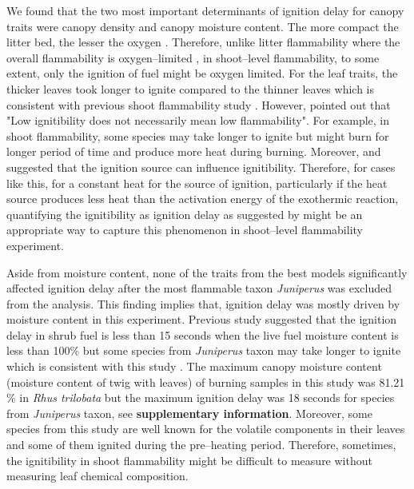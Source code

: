 \documentclass{bmcart}
\begin{document}
We found that the two most important determinants of ignition delay for canopy traits were canopy density and canopy moisture content. The more compact the litter bed, the lesser the oxygen  \citep{scarff2006leaf, van2012species, engber2012patterns, de2012leaf, cornwell2015flammability}.  
Therefore, unlike litter flammability where the overall flammability is oxygen--limited \citep{schwilk2015dimensions}, in shoot--level flammability, to some extent, only the ignition of fuel might be oxygen limited. For the leaf traits, the thicker leaves took longer to ignite compared to the thinner leaves which is consistent with previous shoot flammability study \citep{alam2020shoot}.  However, \citet{montgomery1971effect} pointed out that "Low ignitibility does not necessarily mean low flammability".  For example, in shoot flammability, some species may take longer to ignite but might burn for longer period of time and produce more heat during burning. Moreover, \citet{anderson1970forest} and  \citet{madrigal2012evaluation} suggested that the ignition source can influence ignitibility. Therefore, for cases like this, for a constant heat for the source of ignition, particularly if the heat source produces less heat than the activation energy of the exothermic reaction, quantifying the ignitibility as ignition delay as suggested by \citep{anderson1970forest} might be an appropriate way to capture this phenomenon in shoot--level flammability experiment.

Aside from moisture content, none of the traits from the best models significantly affected ignition delay after the most flammable taxon \emph{Juniperus} was excluded from the analysis. This finding implies that, ignition delay was mostly driven by moisture content in this experiment. Previous study suggested that the ignition delay in shrub fuel is less than 15 seconds when the live fuel moisture content is less than 100\% but some species from \emph{Juniperus} taxon may take longer to ignite which is consistent with this study \citep{pellizzaro2007seasonal}. The maximum canopy moisture content (moisture content of twig with leaves) of burning samples in this study was 81.21 \% in \emph{Rhus trilobata} but the maximum ignition delay was 18 seconds for species from \emph{Juniperus} taxon, see \textbf{supplementary information}.
Moreover, some species from this study are well known for the volatile components in their leaves and some of them  ignited during the pre--heating period. Therefore, sometimes, the ignitibility in shoot flammability might be difficult to measure without measuring leaf chemical composition. 
\end{document}
